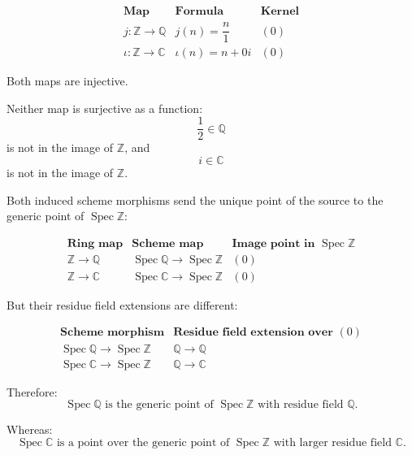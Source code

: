 \documentclass[12pt,a4paper]{article}
\DeclareMathOperator{\Spec}{Spec}
\theoremstyle{notespace}
\begin{document}
\[
\begin{array}{c|c|c}
	\textbf{Map}
	&
	\textbf{Formula}
	&
	\textbf{Kernel}
	\\
	\hline
	j:\mathbb Z\to\mathbb Q
	&
	j(n)=\dfrac{n}{1}
	&
	(0)
	\\[10pt]
	\iota:\mathbb Z\to\mathbb C
	&
	\iota(n)=n+0i
	&
	(0)
\end{array}
\]

Both maps are injective.

Neither map is surjective as a function:
\[
\frac12\in\mathbb Q
\]
is not in the image of \(\mathbb Z\), and
\[
i\in\mathbb C
\]
is not in the image of \(\mathbb Z\).

Both induced scheme morphisms send the unique point of the source to the generic point of \(\Spec\mathbb Z\):

\[
\begin{array}{c|c|c}
	\textbf{Ring map}
	&
	\textbf{Scheme map}
	&
	\textbf{Image point in }\Spec\mathbb Z
	\\
	\hline
	\mathbb Z\to\mathbb Q
	&
	\Spec\mathbb Q\to\Spec\mathbb Z
	&
	(0)
	\\[5pt]
	\mathbb Z\to\mathbb C
	&
	\Spec\mathbb C\to\Spec\mathbb Z
	&
	(0)
\end{array}
\]

But their residue field extensions are different:

\[
\begin{array}{c|c}
	\textbf{Scheme morphism}
	&
	\textbf{Residue field extension over }(0)
	\\
	\hline
	\Spec\mathbb Q\to\Spec\mathbb Z
	&
	\mathbb Q\to\mathbb Q
	\\[5pt]
	\Spec\mathbb C\to\Spec\mathbb Z
	&
	\mathbb Q\to\mathbb C
\end{array}
\]

Therefore:
\[
\boxed{
	\Spec\mathbb Q
	\text{ is the generic point of }
	\Spec\mathbb Z
	\text{ with residue field }\mathbb Q.
}
\]

Whereas:
\[
\boxed{
	\Spec\mathbb C
	\text{ is a point over the generic point of }
	\Spec\mathbb Z
	\text{ with larger residue field }\mathbb C.
}
\]
\end{document}
